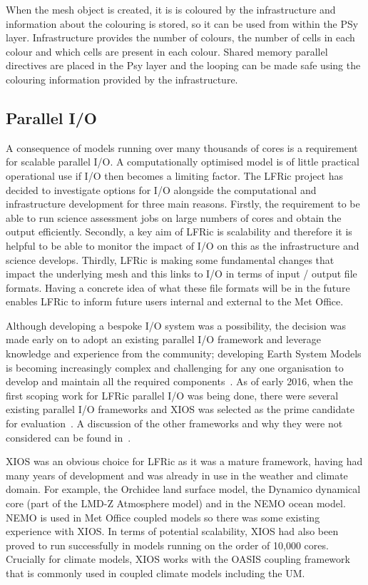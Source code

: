 \documentclass[times]{elsarticle}
\begin{document}
When the mesh object is created, it is is coloured by the infrastructure
and information about the colouring is stored, so it can be used from
within the PSy layer. Infrastructure provides the number of colours,
the number of cells in each colour and which cells are present in each
colour. Shared memory parallel directives are placed in the Psy layer
and the looping can be made safe using the colouring information
provided by the infrastructure. 

\subsection{\label{sec:io}Parallel I/O}

A consequence of models running over many thousands of cores is a requirement
for scalable parallel I/O. A computationally optimised model is of little practical
operational use if I/O then becomes a limiting factor. The LFRic project has
decided to investigate options for I/O alongside the computational
and infrastructure development for three main reasons. Firstly, the requirement
to be able to run science assessment jobs on large numbers of cores and obtain the
output efficiently. Secondly, a key aim of LFRic is scalability and therefore it is
helpful to be able to monitor the impact of I/O on this as the infrastructure and
science develops. Thirdly, LFRic is making some fundamental changes that impact the
underlying mesh and this links to I/O in terms of input / output file formats. Having
a concrete idea of what these file formats will be in the future enables LFRic to
inform future users internal and external to the Met Office.

Although developing a bespoke I/O system was a possibility, the decision was
made early on to adopt an existing parallel I/O framework and leverage knowledge and
experience from the community; developing Earth System Models is becoming increasingly
complex and challenging for any one organisation to develop and maintain all the required
components~\cite{gmd-2017-186}.
As of early 2016, when the first scoping work for LFRic parallel I/O was being done,
there were several existing parallel I/O frameworks and XIOS was selected as the prime
candidate for evaluation~\cite{XIOSWiki}. A discussion of the other frameworks and why
they were not considered can be found in~\cite{Adams2018}.

XIOS was an obvious choice for LFRic as it was a mature framework, having had many years
of development and was already in use in the weather and climate domain. For example,
the Orchidee land surface model, the Dynamico dynamical core (part of the LMD-Z
Atmosphere model) and in the NEMO ocean model. NEMO is used in Met Office coupled
models so there was some existing experience with XIOS. In terms of potential scalability,
XIOS had also been proved to run successfully in models running on the order of 10,000
cores. Crucially for climate models, XIOS works with the OASIS coupling framework that
is commonly used in coupled climate models including the UM. 
\end{document}
